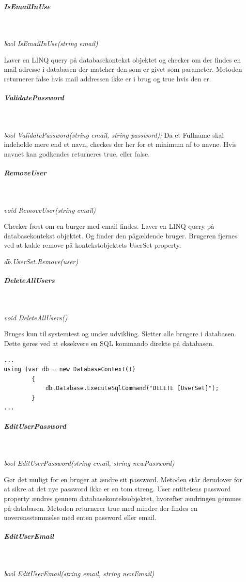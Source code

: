 \subparagraph{IsEmailInUse}\

\textit{bool IsEmailInUse(string email)}

Laver en LINQ query på databasekontekst objektet og checker om der findes en mail adresse i databasen der matcher den som er givet som parameter. Metoden returnerer false hvis mail addressen ikke er i brug og true hvis den er.

\subparagraph{ValidatePassword}\

\textit{bool ValidatePassword(string email, string password);}
Da et Fullname skal indeholde mere end et navn, checkes der her for et minimum af to navne. Hvis navnet kan godkendes returneres true, eller false.

\subparagraph{RemoveUser}\

\textit{void RemoveUser(string email)}

Checker først om en burger med email findes.
Laver en LINQ query på databasekontekst objektet. Og finder den pågældende bruger.
Brugeren fjernes ved at kalde remove på kontekstobjektets UserSet property.

\textit{db.UserSet.Remove(user)}

\subparagraph{DeleteAllUsers}\

\textit{void DeleteAllUsers()}

Bruges kun til systemtest og under udvikling.
Sletter alle brugere i databasen. Dette gøres ved at eksekvere en SQL kommando direkte på databasen. 

\begin{lstlisting}[caption=SQL injection på databasen ved sletning af brugere, label=sqlDeleteUsers]
...
using (var db = new DatabaseContext())
		{
			db.Database.ExecuteSqlCommand("DELETE [UserSet]");
		}
...	
\end{lstlisting}

\subparagraph{EditUserPassword}\

\textit{bool EditUserPassword(string email, string newPassword)}

Gør det muligt for en bruger at ændre sit password. Metoden står derudover for at sikre at det nye password ikke er en tom streng. User entitetens password property ændres gennem databasekonteksobjektet, hvorefter ændringen gemmes på databasen.
Metoden returnerer true med mindre der findes en uoverensstemmelse med enten password eller email.

\subparagraph{EditUserEmail}\

\textit{bool EditUserEmail(string email, string newEmail)}

